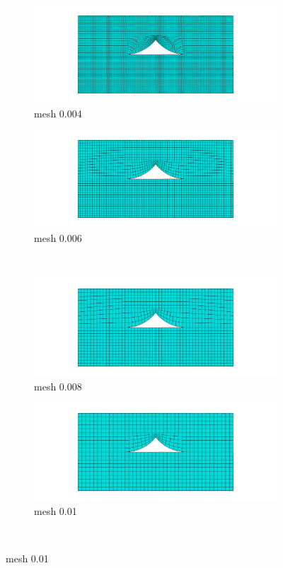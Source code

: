 \begin{figure}
\centering
  \begin{subfigure}[b]{0.48\textwidth}
    \includegraphics[width=\textwidth]{chapter_7_non-elasticmodelling/figures/mesh0004.png}
    \caption{ mesh 0.004}
  \end{subfigure}
  \begin{subfigure}[b]{0.48\textwidth}
    \includegraphics[width=\textwidth]{chapter_7_non-elasticmodelling/figures/mesh0006.png}
    \caption{ mesh 0.006}
  \end{subfigure}
  \\
    \begin{subfigure}[b]{0.48\textwidth}
    \includegraphics[width=\textwidth]{chapter_7_non-elasticmodelling/figures/mesh0008.png}
    \caption{ mesh 0.008}
  \end{subfigure}
  \begin{subfigure}[b]{0.48\textwidth}
    \includegraphics[width=\textwidth]{chapter_7_non-elasticmodelling/figures/mesh001.png}
    \caption{ mesh 0.01}
  \end{subfigure}
  \\
  

\end{figure}
